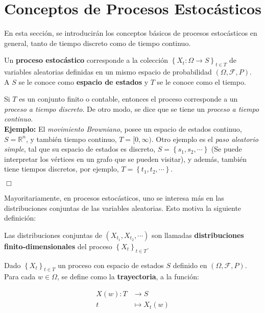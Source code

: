 \section{Conceptos de Procesos Estocásticos}

En esta sección, se introducirán los conceptos básicos de procesos estocásticos en general, tanto de tiempo discreto como de tiempo continuo.

\begin{boxDef}
	Un \textbf{proceso estocástico} corresponde a la colección $\left\{ X_t : \Omega \rightarrow S \right\}_{t \in T}$ de variables aleatorias definidas en un mismo espacio de probabilidad $(\Omega, \mathcal{F}, P)$. \\

	A $S$ se le conoce como \textbf{espacio de estados} y $T$ se le conoce como el tiempo.	
\end{boxDef}

Si $T$ es un conjunto finito o contable, entonces el proceso corresponde a un \textit{proceso a tiempo discreto}. De otro modo, se dice que se tiene un \textit{proceso a tiempo continuo}. \\

\textbf{Ejemplo: } El \textit{movimiento Browniano}, posee un espacio de estados continuo, $S = \mathbb{R}^n$, y también tiempo continuo, $T = [0, \infty)$. Otro ejemplo es el \textit{paso aleatorio simple}, tal que su espacio de estados es discreto, $S = \left\{ s_1, s_2, \cdots \right\}$ (Se puede interpretar los vértices en un grafo que se pueden visitar), y además, también tiene tiempos discretos, por ejemplo, $T = \left\{ t_1, t_2, \cdots \right\}$.

\begin{flushright}
	$\Box$
\end{flushright}

Mayoritariamente, en procesos estocásticos, uno se interesa más en las distribuciones conjuntas de las variables aleatorias. Esto motiva la siguiente definición:

\begin{boxDef}
	Las distribuciones conjuntas de $(X_{t_1}, X_{t_2}, \cdots)$ son llamadas \textbf{distribuciones finito-dimensionales} del proceso $\left\{ X_t \right\}_{t \in T}$.
\end{boxDef}


\begin{boxDef}
	Dado $\left\{ X_t \right\}_{t \in T}$ un proceso con espacio de estados $S$ definido en $(\Omega, \mathcal{F}, P)$. Para cada $w \in \Omega$, se define como la \textbf{trayectoria}, a la función:

	\begin{align*}
		X(w): T &\rightarrow S \\
		t &\mapsto X_t (w)
	\end{align*}



\end{boxDef}

